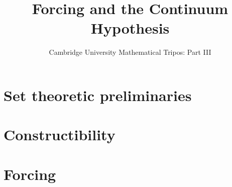 \documentclass{article}
\title{Forcing and the Continuum Hypothesis}
\author{Cambridge University Mathematical Tripos: Part III}
\begin{document}
\maketitle

\tableofcontentsnewpage{}

\section{Set theoretic preliminaries}

\section{Constructibility}

\section{Forcing}

\end{document}
